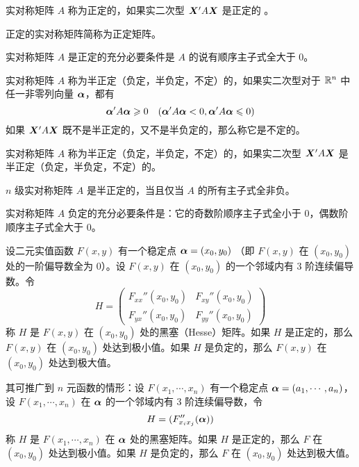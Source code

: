 \begin{definition}
    实对称矩阵 $A$ 称为正定的，如果实二次型 $\boldsymbol{X}'A\boldsymbol{X}$ 是正定的 。
\end{definition}

正定的实对称矩阵简称为正定矩阵。

\begin{theorem}
    实对称矩阵 $A$ 是正定的充分必要条件是 $A$ 的说有顺序主子式全大于 $0$。
\end{theorem}

\begin{definition}
    实对称矩阵 $A$ 称为半正定（负定，半负定，不定）的，如果实二次型对于 $\mathbb{R}^n$ 中任一非零列向量 $\boldsymbol{\alpha}$，都有
    $$\boldsymbol{\alpha}'A\boldsymbol{\alpha} \geqslant 0 \quad (\boldsymbol{\alpha}'A\boldsymbol{\alpha}<0,\boldsymbol{\alpha}'A\boldsymbol{\alpha}\leqslant 0)$$
    如果 $\boldsymbol{X}'A\boldsymbol{X}$ 既不是半正定的，又不是半负定的，那么称它是不定的。
\end{definition}

\begin{definition}
    实对称矩阵 $A$ 称为半正定（负定，半负定，不定）的，如果实二次型 $\boldsymbol{X}'A\boldsymbol{X}$ 是半正定（负定，半负定，不定）的。
\end{definition}

\begin{theorem}
    $n$ 级实对称矩阵 $A$ 是半正定的，当且仅当 $A$ 的所有主子式全非负。
\end{theorem}

\begin{theorem}
    实对称矩阵 $A$ 负定的充分必要条件是：它的奇数阶顺序主子式全小于 $0$，偶数阶顺序主子式全大于 $0$。
\end{theorem}

\begin{theorem}
    设二元实值函数 $F(x,y)$ 有一个稳定点 $\boldsymbol{\alpha}=(x_0,y_0)$ （即 $F(x,y)$ 在 $(x_0,y_0)$ 处的一阶偏导数全为 $0$）。设 $F(x,y)$ 在 $(x_0,y_0)$ 的一个邻域内有 3 阶连续偏导数。令
    $$H = \left(\begin{matrix}
        F_{xx}''(x_0,y_0) & F_{xy}''(x_0,y_0)\\
        F_{yx}''(x_0,y_0) & F_{yy}''(x_0,y_0)
    \end{matrix}\right)$$
    称 $H$ 是 $F(x,y)$ 在 $(x_0,y_0)$ 处的黑塞（Hesse）矩阵。如果 $H$ 是正定的，那么 $F(x,y)$ 在 $(x_0,y_0)$ 处达到极小值。如果 $H$ 是负定的，那么 $F(x,y)$ 在 $(x_0,y_0)$ 处达到极大值。
\end{theorem}

其可推广到 $n$ 元函数的情形：设 $F(x_1,\cdots,x_n)$ 有一个稳定点 $\boldsymbol{\alpha} = (a_1,\cdots,a_n)$，设 $F(x_1,\cdots,x_n)$ 在 $\boldsymbol{\alpha}$ 的一个邻域内有 3 阶连续偏导数，令
$$H = (F_{x_ix_j}''(\boldsymbol{\alpha}))$$
称 $H$ 是 $F(x_1,\cdots,x_n)$ 在 $\boldsymbol{\alpha}$ 处的黑塞矩阵。如果 $H$ 是正定的，那么 $F$ 在 $(x_0,y_0)$ 处达到极小值。如果 $H$ 是负定的，那么 $F$ 在 $(x_0,y_0)$ 处达到极大值。